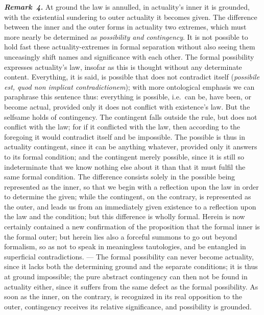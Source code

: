 \documentclass[12pt]{book}
\newcommand{\anm}[1]{\emph{\textbf{Remark~#1.}}}
\begin{document}
\anm{4} At ground the law is annulled, in actuality's inner it is grounded,
with the existential sundering to outer actuality it becomes given. The
difference between the inner and the outer forms in actuality two extremes,
which must more nearly be determined as \emph{possibility and contingency}.
It is not possible to hold fast these actuality-extremes in formal
separation without also seeing them unceasingly shift names and significance
with each other. The formal possibility expresses actuality's law, insofar
as this is thought without any determinate content. Everything, it is said,
is possible that does not contradict itself (\textit{possibile est, quod non
implicat contradictionem}); with more ontological emphasis we can paraphrase
this sentence thus: everything is possible, i.e.\ can be, have been, or
become actual, provided only it does not conflict with existence's law. But
the selfsame holds of contingency. The contingent falls outside the rule,
but does not conflict with the law; for if it conflicted with the law, then
according to the foregoing it would contradict itself and be impossible. The
possible is thus in actuality contingent, since it can be anything whatever,
provided only it answers to its formal condition; and the contingent merely
possible, since it is still so indeterminate that we know nothing else about
it than that it must fulfil the same formal condition. The difference
consists solely in the possible being represented as the inner, so that we
begin with a reflection upon the law in order to determine the given; while
the contingent, on the contrary, is represented as the outer, and leads us
from an immediately given existence to a reflection upon the law and the
condition; but this difference is wholly formal. Herein is now certainly
contained a new confirmation of the proposition that the formal inner is the
formal outer; but herein lies also a forceful summons to go out beyond
formalism, so as not to speak in meaningless tautologies, and be entangled
in superficial contradictions. --- The formal possibility can never become
actuality, since it lacks both the determining ground and the separate
conditions; it is thus at ground impossible; the pure abstract contingency
can then not be found in actuality either, since it suffers from the same
defect as the formal possibility. As soon as the inner, on the contrary, is
recognized in its real opposition to the outer, contingency receives its
relative significance, and possibility is grounded.
\end{document}
